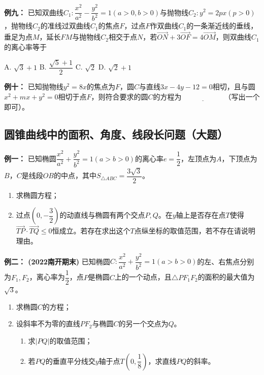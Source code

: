 \documentclass{article}
\begin{document}
\noindent\textbf{例九：} 已知双曲线$C_1:\dfrac{x^2}{a^2}-\dfrac{y^2}{b^2}=1(a>0,b>0)$与抛物线$C_2:y^2=2px(p>0)$，抛物线$C_2$的准线过双曲线$C_1$的焦点$F$，过点$F$作双曲线$C_1$的一条渐近线的垂线，垂足为点$M$，延长$FM$与抛物线$C_2$相交于点$N$，若$\overrightarrow{ON}+3\overrightarrow{OF}=4\overrightarrow{OM}$，则双曲线$C_1$的离心率等于
\vspace{0.5em}

A. $\sqrt{3}+1$ \quad B. $\dfrac{\sqrt{5}+1}{2}$ \quad C. $\sqrt{2}$ \quad D. $\sqrt{2}+1$
\vspace{4\baselineskip}

\noindent\textbf{例十：} 已知抛物线$y^2=8x$的焦点为$F$，圆$C$与直线$3x-4y-12=0$相切，且与圆$x^2+mx+y^2=0$相切于点$F$，则符合要求的圆$C$的方程为$\underline{\qquad\qquad\qquad}$（写出一个即可）。
\vspace{4\baselineskip}
\newpage

\subsection{圆锥曲线中的面积、角度、线段长问题（大题）}

\textbf{例一： } 已知椭圆$\dfrac{x^2}{a^2}+\dfrac{y^2}{b^2}=1(a>b>0)$的离心率$e=\dfrac{1}{2}$，左顶点为$A$，下顶点为$B$，$C$是线段$OB$的中点，其中$S_{\triangle ABC}=\dfrac{3\sqrt{3}}{2}$。
\begin{enumerate}[label=(\arabic*)]
    \item 求椭圆方程；
    \item 过点$\left(0,-\dfrac{3}{2}\right)$的动直线与椭圆有两个交点$P,Q$。在$y$轴上是否存在点$T$使得$\overrightarrow{TP} \cdot \overrightarrow{TQ} \leq 0$恒成立。若存在求出这个$T$点纵坐标的取值范围，若不存在请说明理由。
\end{enumerate}

\vspace{18\baselineskip}

\textbf{例二： (2022南开期末)} 已知椭圆$C:\dfrac{x^2}{a^2}+\dfrac{y^2}{b^2}=1(a>b>0)$的左、右焦点分别为$F_1,F_2$，离心率为$\dfrac{1}{2}$，点$P$是椭圆$C$上的一个动点，且$\triangle PF_1F_2$的面积的最大值为$\sqrt{3}$。
\begin{enumerate}[label=(\Roman*)]
    \item 求椭圆$C$的方程；
    \item 设斜率不为零的直线$PF_2$与椭圆$C$的另一个交点为$Q$。
    \begin{enumerate}[label=(\roman*)]
        \item 求$|PQ|$的取值范围；
        \item 若$PQ$的垂直平分线交$y$轴于点$T\left(0,\dfrac{1}{8}\right)$，求直线$PQ$的斜率。
    \end{enumerate}
\end{enumerate}
\end{document}
